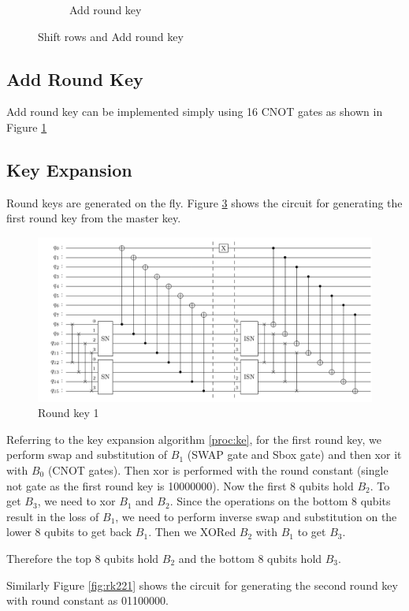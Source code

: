 \documentclass[preprint]{transcrypto}
\begin{document}
\begin{figure}[h!]
\begin{subfigure}{.5\textwidth}
  \caption{Add round key}
  \label{fig:ark21}
\end{subfigure}
\caption{Shift rows and Add round key}
\label{fig:test}
\end{figure}

\subsection{Add Round Key}
Add round key can be implemented simply using 16 CNOT gates as shown in Figure \ref{fig:ark21}

\subsection{Key Expansion}
Round keys are generated on the fly. Figure \ref{fig:rk121} shows the circuit for generating the first round key from the master key. 

\begin{figure}[h!]
    \centering
    \includegraphics[width=0.8\linewidth]{saes21/r1k.pdf}
    \caption{Round key 1}
    \label{fig:rk121}
\end{figure}

Referring to the key expansion algorithm \ref{proc:ke}, for the first round key, we perform swap and substitution of $B_1$ (SWAP gate and Sbox gate) and then xor it with $B_0$ (CNOT gates). Then xor is performed with the round constant (single not gate as the first round key is 10000000). Now the first 8 qubits hold $B_2$. To get $B_3$, we need to xor $B_1$ and $B_2$. Since the operations on the bottom 8 qubits result in the loss of $B_1$, we need to perform inverse swap and substitution on the lower 8 qubits to get back $B_1$. Then we XORed $B_2$ with $B_1$ to get $B_3$. 

Therefore the top 8 qubits hold $B_2$ and the bottom 8 qubits hold $B_3$.

Similarly Figure \ref{fig:rk221} shows the circuit for generating the second round key with round constant as 01100000.
\end{document}
